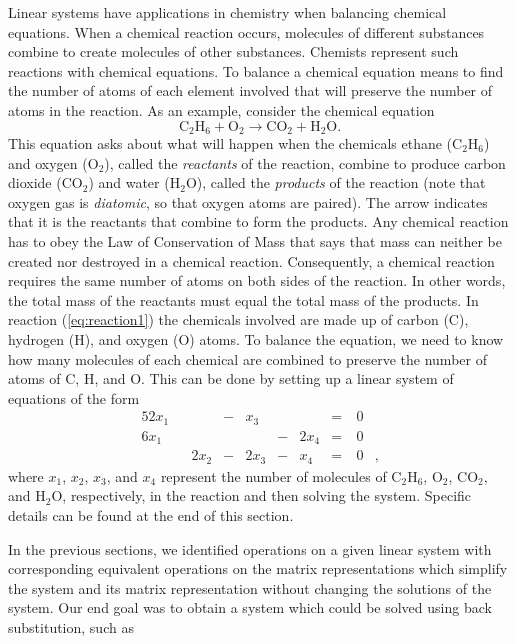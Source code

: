 Linear systems have applications in chemistry when balancing chemical equations. When a chemical reaction occurs, molecules of different substances combine to create molecules of other substances. Chemists represent such reactions with chemical equations. To balance a chemical equation means to find the number of atoms of each element involved that will preserve the number of atoms in the reaction. 
As an example, consider the chemical equation
\begin{equation}
\text{C}_2\text{H}_6 + \text{O}_2 \to \text{CO}_2 + \text{H}_2\text{O}. \label{eq:reaction1}
\end{equation}
This equation asks about what will happen when the chemicals ethane ($\text{C}_2\text{H}_6$) and oxygen ($\text{O}_2$), called the \emph{reactants} of the reaction, combine to produce carbon dioxide ($\text{CO}_2$) and water ($\text{H}_2\text{O}$), called the \emph{products} of the reaction (note that oxygen gas is \emph{diatomic}, so that oxygen atoms are paired). The arrow indicates that it is the reactants that combine to form the products. Any chemical reaction has to obey the Law of Conservation of Mass that says that mass can neither be created nor destroyed in a chemical reaction. Consequently, a chemical reaction requires the same number of atoms on both sides of the reaction. In other words, the total mass of the reactants must equal the total mass of the products. In reaction (\ref{eq:reaction1}) the chemicals involved are made up of carbon (C), hydrogen (H), and oxygen (O) atoms. To balance the equation, we need to know how many molecules of each chemical are combined to preserve the number of atoms of C, H, and O. This can be done by setting up a linear system of equations of the form 
\begin{alignat*}{5}
{2}x_1 	&{}		&{}		&{}-{}	&{}x_3	&{}		&{} 			&{}={}	& \ 0&{}   \\
{6}x_1	&{} 		&{} 		&{}		&{}		&{}-{}	&{2}x_4 	&{}={} 	& \ 0&{} \\
{}			&{}		&{2}x_2	&{}-{} 	&{2}x_3	&{}-{}	&{}x_4		&{}={} 	& \ 0&{,}
\end{alignat*}
where $x_1$, $x_2$, $x_3$, and $x_4$ represent the number of molecules of $\text{C}_2\text{H}_6$,  $\text{O}_2$,  $\text{CO}_2$, and $\text{H}_2\text{O}$, respectively, in the reaction and then solving the system. Specific details can be found at the end of this section. 


In the previous sections, we identified operations on a given linear system with corresponding equivalent operations on the matrix representations which simplify the system and its matrix representation without changing the solutions of the system. Our end goal was to obtain a system which could be solved using back substitution, such as 

